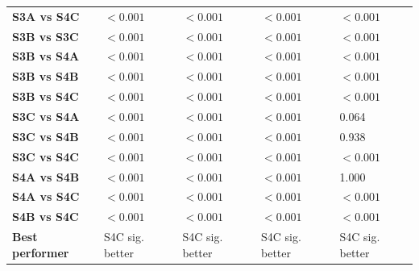 \begin{table}[H]
{\begin{tabular}{lllll}
        \textbf{S3A vs S4C} & $< 0.001$ & $< 0.001$ & $< 0.001$ & $< 0.001$ \\
        \textbf{S3B vs S3C} & $< 0.001$ & $< 0.001$ & $< 0.001$ & $< 0.001$ \\
        \textbf{S3B vs S4A} & $< 0.001$ & $< 0.001$ & $< 0.001$ & $< 0.001$ \\
        \textbf{S3B vs S4B} & $< 0.001$ & $< 0.001$ & $< 0.001$ & $< 0.001$ \\
        \textbf{S3B vs S4C} & $< 0.001$ & $< 0.001$ & $< 0.001$ & $< 0.001$ \\
        \textbf{S3C vs S4A} & $< 0.001$ & $< 0.001$ & $< 0.001$ & 0.064 \\
        \textbf{S3C vs S4B} & $< 0.001$ & $< 0.001$ & $< 0.001$ & 0.938 \\
        \textbf{S3C vs S4C} & $< 0.001$ & $< 0.001$ & $< 0.001$ & $< 0.001$ \\
        \textbf{S4A vs S4B} & $< 0.001$ & $< 0.001$ & $< 0.001$ & 1.000 \\
        \textbf{S4A vs S4C} & $< 0.001$ & $< 0.001$ & $< 0.001$ & $< 0.001$ \\
        \textbf{S4B vs S4C} & $< 0.001$ & $< 0.001$ & $< 0.001$ & $< 0.001$ \\
        \textbf{Best performer} & S4C sig. better & S4C sig. better & S4C sig. better & S4C sig. better \\
        \bottomrule
    \end{tabular}}
\end{table}